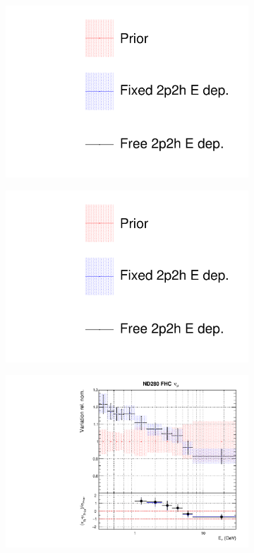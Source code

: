 \begin{figure}
\centering
\begin{subfigure}{0.3\textwidth}
  \centering
  \includegraphics[width=1.0\linewidth, trim={5mm  130mm 0mm 10mm}, clip]{figs/fixed2p2hfits_leg}
\end{subfigure}\begin{subfigure}{0.3\textwidth}
  \centering
  \includegraphics[width=1.0\linewidth, trim={5mm  0mm 0mm 70mm}, clip]{figs/fixed2p2hfits_leg}
\end{subfigure}
\begin{subfigure}{0.45\textwidth}
  \centering
  \includegraphics[width=0.75\linewidth]{figs/fixed2p2hflux0}

\end{subfigure}
\end{figure}
